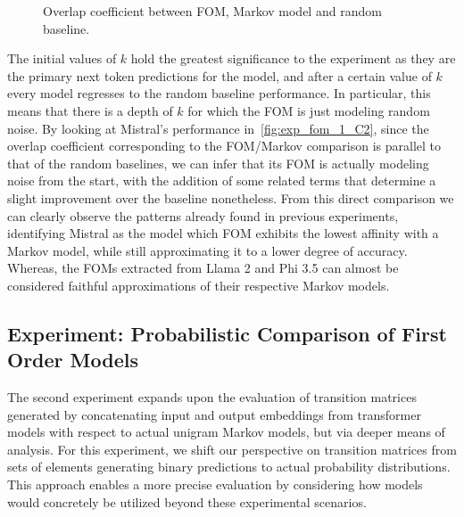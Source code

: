 \begin{figure}[t!]
    \centering
    \caption{Overlap coefficient between FOM, Markov model and random baseline.}
    \label{fig:exp_fom_1_C}
\end{figure}

The initial values of $k$ hold the greatest significance to the experiment as they are the primary next token predictions for the model, and after a certain value of $k$ every model regresses to the random baseline performance.
In particular, this means that there is a depth of $k$ for which the FOM is just modeling random noise.
By looking at Mistral's performance in~\cref{fig:exp_fom_1_C2}, since the overlap coefficient corresponding to the FOM/Markov comparison is parallel to that of the random baselines, we can infer that its FOM is actually modeling noise from the start, with the addition of some related terms that determine a slight improvement over the baseline nonetheless.
From this direct comparison we can clearly observe the patterns already found in previous experiments, identifying Mistral as the model which FOM exhibits the lowest affinity with a Markov model, while still approximating it to a lower degree of accuracy.
Whereas, the FOMs extracted from Llama 2 and Phi 3.5 can almost be considered faithful approximations of their respective Markov models.

\subsection{Experiment: Probabilistic Comparison of First Order Models}\label{ssec:exp_fom_exp2}

The second experiment expands upon the evaluation of transition matrices generated by concatenating input and output embeddings from transformer models with respect to actual unigram Markov models, but via deeper means of analysis.
For this experiment, we shift our perspective on transition matrices from sets of elements generating binary predictions to actual probability distributions.
This approach enables a more precise evaluation by considering how models would concretely be utilized beyond these experimental scenarios.

